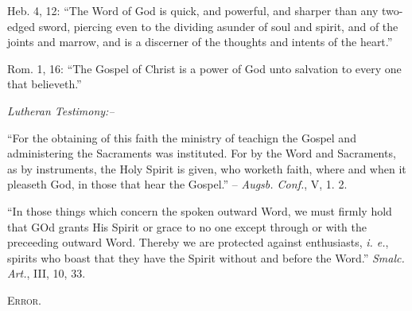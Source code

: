 \documentclass[
]{book}
\begin{document}
Heb. 4, 12: ``The Word of God is quick, and powerful, and sharper than any two-edged sword, piercing even to the dividing asunder of soul and spirit, and of the joints and marrow, and is a discerner of the thoughts and intents of the heart.''

Rom. 1, 16: ``The Gospel of Christ is a power of God unto salvation to every one that believeth.''

\begin{center}
\textsl{Lutheran Testimony:--}
\end{center}

``For the obtaining of this faith the ministry of teachign the Gospel and administering the Sacraments was instituted. For by the Word and Sacraments, as by instruments, the Holy Spirit is given, who worketh faith, where and when it pleaseth God, in those that hear the Gospel.'' -- \emph{Augsb. Conf.}, V, 1. 2.

``In those things which concern the spoken outward Word, we must firmly hold that GOd grants His Spirit or grace to no one except through or with the preceeding outward Word. Thereby we are protected against enthusiasts, \emph{i. e.}, spirits who boast that they have the Spirit without and before the Word.'' \emph{Smalc. Art.}, III, 10, 33.

\begin{center}
\textsc{Error.}
\end{center}
\end{document}
